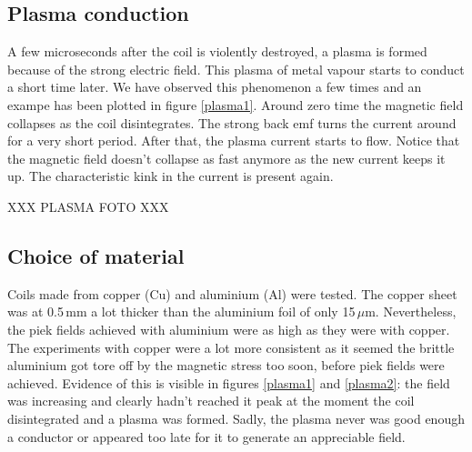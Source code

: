 \subsection{Plasma conduction}

A few microseconds after the coil is violently destroyed, a plasma is formed 
because of the strong electric field. This plasma of metal vapour starts to 
conduct a short time later. We have observed this phenomenon a few times and an 
exampe has been plotted in figure \ref{plasma1}. Around zero time the magnetic 
field collapses as the coil disintegrates. The strong back emf turns the 
current around for a very short period. After that, the plasma current starts 
to flow. Notice that the magnetic field doesn't collapse as fast anymore as the 
new current keeps it up. The characteristic kink in the current is present 
again.

XXX PLASMA FOTO XXX



\subsection{Choice of material}

Coils made from copper (Cu) and aluminium (Al) were tested. The copper sheet 
was at 0.5\,mm a lot thicker than the aluminium foil of only 15\,$\mu$m.  
Nevertheless, the piek fields achieved with aluminium were as high as they were 
with copper. The experiments with copper were a lot more consistent as it 
seemed the brittle aluminium got tore off by the magnetic stress too soon, 
before piek fields were achieved. Evidence of this is visible in figures 
\ref{plasma1} and \ref{plasma2}: the field was increasing and clearly hadn't 
reached it peak at the moment the coil disintegrated and a plasma was formed.  
Sadly, the plasma never was good enough a conductor or appeared too late for it 
to generate an appreciable field.

